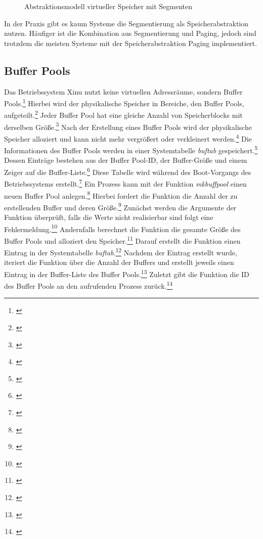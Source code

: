 \begin{figure}[htb]
	\centering
	\caption{Abstraktionsmodell virtueller Speicher mit Segmenten}
\end{figure}

In der Praxis gibt es kaum Systeme die Segmentierung als Speicherabstraktion nutzen. Häufiger ist die Kombination aus Segmentierung und Paging, jedoch sind trotzdem die meisten Systeme mit der Speicherabstraktion Paging implementiert.

\subsection{Buffer Pools}
\label{subsec:BufferPools}
Das Betriebssystem Xinu nutzt keine virtuellen Adressräume, sondern Buffer Pools.\footnote{\cite[S.~176]{Comer.2015}} Hierbei wird der physikalische Speicher in Bereiche, den Buffer Pools, aufgeteilt.\footnote{\cite[S.~176]{Comer.2015}} Jeder Buffer Pool hat eine gleiche Anzahl von Speicherblocks mit derselben Größe.\footnote{\cite[S.~176]{Comer.2015}} Nach der Erstellung eines Buffer Pools wird der physikalische Speicher alloziert und kann nicht mehr vergrößert oder verkleinert werden.\footnote{\cite[S.~177]{Comer.2015}} Die Informationen des Buffer Pools werden in einer Systemtabelle \textit{buftab} gespeichert.\footnote{\cite[S.~177]{Comer.2015}} Dessen Einträge bestehen aus der Buffer Pool-ID, der Buffer-Größe und einem Zeiger auf die Buffer-Liste.\footnote{\cite[S.~177]{Comer.2015}}  Diese Tabelle wird während des Boot-Vorgangs des Betriebssystems erstellt.\footnote{\cite[S.~183]{Comer.2015}}
Ein Prozess kann mit der Funktion \textit{mkbuffpool} einen neuen Buffer Pool anlegen.\footnote{\cite[S.~181]{Comer.2015}} Hierbei fordert die Funktion die Anzahl der zu erstellenden Buffer und deren Größe.\footnote{\cite[S.~181]{Comer.2015}} Zunächst werden die Argumente der Funktion überprüft, falls die Werte nicht realisierbar sind folgt eine Fehlermeldung.\footnote{\cite[S.~181]{Comer.2015}} Andernfalls berechnet die Funktion die gesamte Größe des Buffer Pools und alloziert den Speicher.\footnote{\cite[S.~181]{Comer.2015}} Darauf erstellt die Funktion einen Eintrag in der Systemtabelle \textit{buftab}.\footnote{\cite[S.~181]{Comer.2015}} Nachdem der Eintrag erstellt wurde, iteriert die Funktion über die Anzahl der Buffers und erstellt jeweils einen Eintrag in der Buffer-Liste des Buffer Pools.\footnote{\cite[S.~181]{Comer.2015}} Zuletzt gibt die Funktion die ID des Buffer Pools an den aufrufenden Prozess zurück.\footnote{\cite[S.~181]{Comer.2015}}

